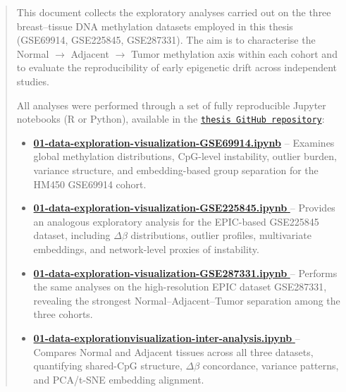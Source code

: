 \documentclass[10pt]{extarticle}
\begin{document}
\begin{abstract}
This document collects the exploratory analyses carried out on the three breast–tissue DNA methylation
datasets employed in this thesis (GSE69914, GSE225845, GSE287331).  
The aim is to characterise the Normal $\rightarrow$ Adjacent $\rightarrow$ Tumor methylation axis within
each cohort and to evaluate the reproducibility of early epigenetic drift across independent studies.

All analyses were performed through a set of fully reproducible Jupyter notebooks (R or Python), available in the 
\href{https://github.com/elisabettaroviera/THESIS/tree/main}{\texttt{thesis GitHub repository}}:

\begin{itemize}[label=-]
    \item 
    \href{https://github.com/elisabettaroviera/THESIS/blob/main/01%20-%20Notebook/01%20-%20Data%20Exploration%20%26%20Visualization/a%20-%20Intra%20Dataset/01-data-exploration-visualization-gse69914.ipynb}{\textbf{01-data-exploration-visualization-GSE69914.ipynb}}  
    -- Examines global methylation distributions, CpG-level instability, outlier burden, variance structure, 
    and embedding-based group separation for the HM450 GSE69914 cohort.

    \item 
    \href{https://github.com/elisabettaroviera/THESIS/blob/main/01%20-%20Notebook/01%20-%20Data%20Exploration%20%26%20Visualization/a%20-%20Intra%20Dataset/01-data-exploration-visualization-gse225845.ipynb}{\textbf{01-data-exploration-visualization-GSE225845.ipynb}  }  
    -- Provides an analogous exploratory analysis for the EPIC-based GSE225845 dataset, including 
    $\Delta\beta$ distributions, outlier profiles, multivariate embeddings, and network-level proxies of instability.

    \item  
    \href{https://github.com/elisabettaroviera/THESIS/blob/main/01%20-%20Notebook/01%20-%20Data%20Exploration%20%26%20Visualization/a%20-%20Intra%20Dataset/01-data-exploration-visualization-gse287331.ipynb}{\textbf{01-data-exploration-visualization-GSE287331.ipynb} }  
    -- Performs the same analyses on the high-resolution EPIC dataset GSE287331, revealing the strongest 
    Normal–Adjacent–Tumor separation among the three cohorts.

    \item 
    \href{https://github.com/elisabettaroviera/THESIS/blob/main/01%20-%20Notebook/01%20-%20Data%20Exploration%20%26%20Visualization/b%20-%20Inter%20Dataset/01-data-explorationvisualization-inter-analysis.ipynb}{\textbf{01-data-explorationvisualization-inter-analysis.ipynb} }  
    -- Compares Normal and Adjacent tissues across all three datasets, quantifying shared-CpG structure, 
    $\Delta\beta$ concordance, variance patterns, and PCA/t-SNE embedding alignment.


\end{itemize}
\end{abstract}
\end{document}
